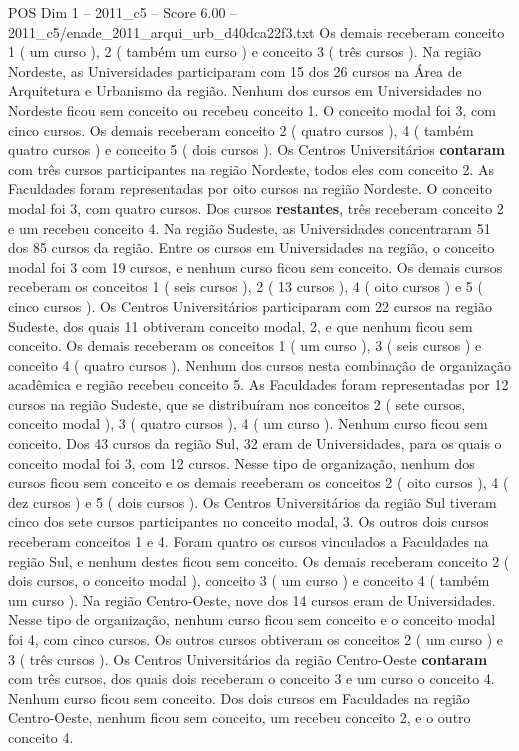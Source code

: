 \begin{textsample}{POS Dim 1 – 2011\_c5 – Score 6.00 – 2011\_c5/enade\_2011\_arqui\_urb\_d40dca22f3.txt}
Os demais receberam conceito 1 ( um curso ), 2 ( também um curso ) e conceito 3 ( três cursos ).
Na região Nordeste, as Universidades participaram com 15 dos 26 cursos na Área de Arquitetura e Urbanismo da região.
Nenhum dos cursos em Universidades no Nordeste ficou sem conceito ou recebeu conceito 1.
O conceito modal foi 3, com cinco cursos.
Os demais receberam conceito 2 ( quatro cursos ), 4 ( também quatro cursos ) e conceito 5 ( dois cursos ).
Os Centros Universitários \textbf{contaram} com três cursos participantes na região Nordeste, todos eles com conceito 2.
As Faculdades foram representadas por oito cursos na região Nordeste.
O conceito modal foi 3, com quatro cursos.
Dos cursos \textbf{restantes}, três receberam conceito 2 e um recebeu conceito 4.
Na região Sudeste, as Universidades concentraram 51 dos 85 cursos da região.
Entre os cursos em Universidades na região, o conceito modal foi 3 com 19 cursos, e nenhum curso ficou sem conceito.
Os demais cursos receberam os conceitos 1 ( seis cursos ), 2 ( 13 cursos ), 4 ( oito cursos ) e 5 ( cinco cursos ).
Os Centros Universitários participaram com 22 cursos na região Sudeste, dos quais 11 obtiveram conceito modal, 2, e que nenhum ficou sem conceito.
Os demais receberam os conceitos 1 ( um curso ), 3 ( seis cursos ) e conceito 4 ( quatro cursos ).
Nenhum dos cursos nesta combinação de organização acadêmica e região recebeu conceito 5.
As Faculdades foram representadas por 12 cursos na região Sudeste, que se distribuíram nos conceitos 2 ( sete cursos, conceito modal ), 3 ( quatro cursos ), 4 ( um curso ).
Nenhum curso ficou sem conceito.
Dos 43 cursos da região Sul, 32 eram de Universidades, para os quais o conceito modal foi 3, com 12 cursos.
Nesse tipo de organização, nenhum dos cursos ficou sem conceito e os demais receberam os conceitos 2 ( oito cursos ), 4 ( dez cursos ) e 5 ( dois cursos ).
Os Centros Universitários da região Sul tiveram cinco dos sete cursos participantes no conceito modal, 3.
Os outros dois cursos receberam conceitos 1 e 4.
Foram quatro os cursos vinculados a Faculdades na região Sul, e nenhum destes ficou sem conceito.
Os demais receberam conceito 2 ( dois cursos, o conceito modal ), conceito 3 ( um curso ) e conceito 4 ( também um curso ).
Na região Centro-Oeste, nove dos 14 cursos eram de Universidades.
Nesse tipo de organização, nenhum curso ficou sem conceito e o conceito modal foi 4, com cinco cursos.
Os outros cursos obtiveram os conceitos 2 ( um curso ) e 3 ( três cursos ).
Os Centros Universitários da região Centro-Oeste \textbf{contaram} com três cursos, dos quais dois receberam o conceito 3 e um curso o conceito 4.
Nenhum curso ficou sem conceito.
Dos dois cursos em Faculdades na região Centro-Oeste, nenhum ficou sem conceito, um recebeu conceito 2, e o outro conceito 4.

\end{textsample}
